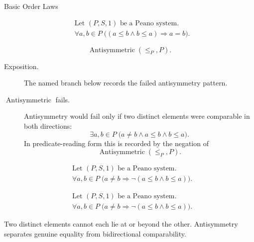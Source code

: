\begin{topicbox}{Basic Order Laws}
\begin{remark*}
\[
\begin{aligned}
&\text{Let } (P,S,1) \text{ be a Peano system.}\\
&\forall a,b \in P\;
\bigl((a \le b \land b \le a) \Longrightarrow a=b\bigr).
\end{aligned}
\]
\end{remark*}

\begin{remark*}
\[
\operatorname{Antisymmetric}(\leq_P,P).
\]
\end{remark*}



\begin{remark*}
\begin{description}
  \item[Exposition.] The named branch below records the failed antisymmetry
  pattern.
  \item[\(\operatorname{Antisymmetric}\) fails.] Antisymmetry would fail only
  if two distinct elements were comparable in both directions:
  \[
  \exists a,b \in P\;\bigl(a\neq b \land a\le b \land b\le a\bigr).
  \]
  In predicate-reading form this is recorded by the negation of
  \[
  \operatorname{Antisymmetric}(\leq_P,P).
  \]
\end{description}
\end{remark*}

\begin{remark*}
\[
\begin{aligned}
&\text{Let } (P,S,1) \text{ be a Peano system.}\\
&\forall a,b \in P\;
\bigl(a \neq b \Longrightarrow \neg(a \le b \land b \le a)\bigr).
\end{aligned}
\]
\end{remark*}

\begin{remark*}
\[
\begin{aligned}
&\text{Let } (P,S,1) \text{ be a Peano system.}\\
&\forall a,b \in P\;
\bigl(a \neq b \Longrightarrow \neg(a \le b \land b \le a)\bigr).
\end{aligned}
\]
\end{remark*}

\begin{remark*}[Interpretation]
Two distinct elements cannot each lie at or beyond the other. Antisymmetry
separates genuine equality from bidirectional comparability.
\end{remark*}


\end{topicbox}
